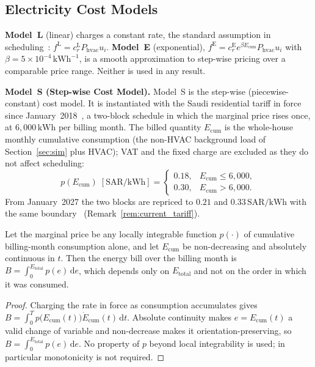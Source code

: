 \documentclass[3p,twocolumn,number]{elsarticle}
\newcommand{\Phvac}{P_{\mathrm{hvac}}}
\newcommand{\SAR}{\text{SAR}}
\newcommand{\kWh}{\text{kWh}}
\begin{document}
\subsection{Electricity Cost Models}
\label{subsec:costmodels}
 
\textbf{Model~L} (linear) charges a constant rate, the standard assumption in scheduling~\cite{ElMakroum2023}: $f^{\mathrm{L}}=c_r^{\mathrm{L}}\Phvac u_i$. \textbf{Model~E} (exponential), $f^{\mathrm{E}}=c_r^{\mathrm{E}}e^{\beta E_{\mathrm{cum}}}\Phvac u_i$ with $\beta=5\times10^{-4}\,\text{kWh}^{-1}$, is a smooth approximation to step-wise pricing over a comparable price range. Neither is used in any result.
 
\textbf{Model~S (Step-wise Cost Model).} Model~S is the step-wise (piecewise-constant) cost model. It is instantiated with the Saudi residential tariff in force since January~2018~\cite{SEC2024}, a two-block schedule in which the marginal price rises once, at $6{,}000\,\kWh$ per billing month. The billed quantity $E_{\mathrm{cum}}$ is the whole-house monthly cumulative consumption (the non-HVAC background load of Section~\ref{sec:sim} plus HVAC); VAT and the fixed charge are excluded as they do not affect scheduling:
\begin{equation}
  p(E_{\mathrm{cum}})\;[\SAR/\kWh]=
  \begin{cases}
    0.18, & E_{\mathrm{cum}}\le6{,}000,\\
    0.30, & E_{\mathrm{cum}}>6{,}000.
  \end{cases}
  \label{eq:stepwise}
\end{equation}
From January~2027 the two blocks are repriced to $0.21$ and $0.33\,\SAR/\kWh$ with the same boundary~\cite{SaudiEnergy2027} (Remark~\ref{rem:current_tariff}).
\begin{proposition}
\label{prop:path}
Let the marginal price be any locally integrable function $p(\cdot)$ of cumulative billing-month consumption alone, and let $E_{\mathrm{cum}}$ be non-decreasing and absolutely continuous in $t$. Then the energy bill over the billing month is $B=\int_{0}^{E_{\mathrm{total}}}p(e)\,\mathrm{d}e$, which depends only on $E_{\mathrm{total}}$ and not on the order in which it was consumed.
\end{proposition}

\begin{proof}
Charging the rate in force as consumption accumulates gives $B=\int_{0}^{T}p\bigl(E_{\mathrm{cum}}(t)\bigr)\dot{E}_{\mathrm{cum}}(t)\, \mathrm{d}t$. Absolute continuity makes $e=E_{\mathrm{cum}}(t)$ a valid change of variable and non-decrease makes it orientation-preserving, so $B=\int_{0}^{E_{\mathrm{total}}}p(e)\,\mathrm{d}e$. No property of $p$ beyond local integrability is used; in particular monotonicity is not required.
\end{proof}
\end{document}
